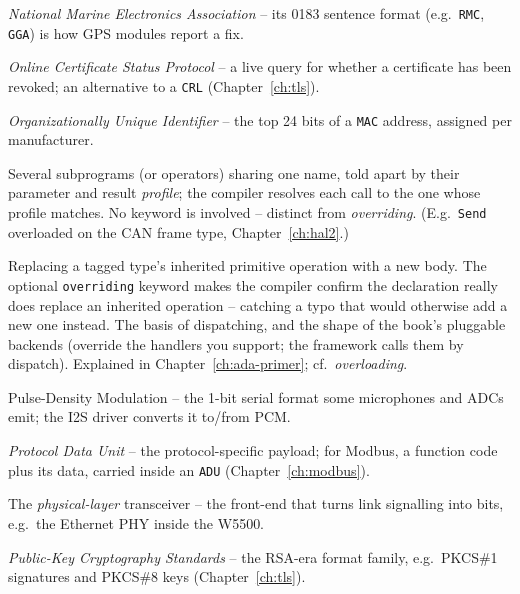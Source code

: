 \begin{description}[style=nextline, leftmargin=0pt]
\item[NMEA] \emph{National Marine Electronics Association} -- its 0183 sentence format (e.g.\ \texttt{RMC}, \texttt{GGA}) is how GPS modules report a fix.

\item[OCSP] \emph{Online Certificate Status Protocol} -- a live query for whether a certificate has been revoked; an alternative to a \texttt{CRL} (Chapter~\ref{ch:tls}).

\item[OUI] \emph{Organizationally Unique Identifier} -- the top 24 bits of a \texttt{MAC} address, assigned per manufacturer.

\item[overloading] Several subprograms (or operators) sharing one name, told apart
  by their parameter and result \emph{profile}; the compiler resolves each call to
  the one whose profile matches. No keyword is involved -- distinct from
  \emph{overriding}. (E.g.\ \texttt{Send} overloaded on the CAN frame type,
  Chapter~\ref{ch:hal2}.)

\item[overriding] Replacing a tagged type's inherited primitive operation with a
  new body. The optional \texttt{overriding} keyword makes the compiler confirm the
  declaration really does replace an inherited operation -- catching a typo that
  would otherwise add a new one instead. The basis of dispatching, and the shape of
  the book's pluggable backends (override the handlers you support; the framework
  calls them by dispatch). Explained in Chapter~\ref{ch:ada-primer}; cf.\
  \emph{overloading}.

\item[PDM] Pulse-Density Modulation -- the 1-bit serial format some microphones
  and ADCs emit; the I2S driver converts it to/from PCM.

\item[PDU] \emph{Protocol Data Unit} -- the protocol-specific payload; for Modbus, a function code plus its data, carried inside an \texttt{ADU} (Chapter~\ref{ch:modbus}).

\item[PHY] The \emph{physical-layer} transceiver -- the front-end that turns link signalling into bits, e.g.\ the Ethernet PHY inside the W5500.

\item[PKCS] \emph{Public-Key Cryptography Standards} -- the RSA-era format family, e.g.\ PKCS\#1 signatures and PKCS\#8 keys (Chapter~\ref{ch:tls}).


\end{description}
